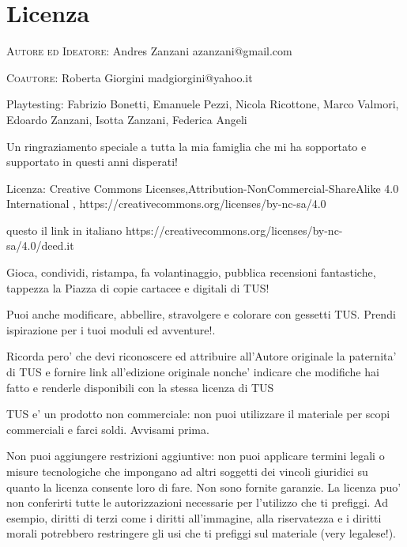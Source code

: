 \documentclass[a4paper,11pt,twoside,openany]{book}
\begin{document}
{\section{Licenza}

\bigskip

\textsc{Autore ed Ideatore}: Andres Zanzani azanzani@gmail.com

\bigskip
\textsc{Coautore}: Roberta Giorgini madgiorgini@yahoo.it

\bigskip

Playtesting: Fabrizio Bonetti, Emanuele Pezzi, Nicola Ricottone, Marco Valmori, Edoardo Zanzani, Isotta Zanzani, Federica Angeli

\bigskip

Un ringraziamento speciale a tutta la mia famiglia che mi ha sopportato e supportato in questi anni disperati!

\bigskip

Licenza: Creative Commons Licenses,Attribution-NonCommercial-ShareAlike 4.0 International , https://creativecommons.org/licenses/by-nc-sa/4.0

questo il link in italiano https://creativecommons.org/licenses/by-nc-sa/4.0/deed.it

Gioca, condividi, ristampa, fa volantinaggio, pubblica recensioni fantastiche, tappezza la Piazza di copie cartacee e digitali di TUS!

Puoi anche modificare, abbellire, stravolgere e colorare con gessetti TUS. Prendi ispirazione per i tuoi moduli ed avventure!.

Ricorda pero' che devi riconoscere ed attribuire all'Autore originale la paternita' di TUS e fornire link all'edizione originale nonche' indicare che modifiche hai fatto e renderle disponibili con la stessa licenza di TUS

\bigskip
TUS e' un prodotto non commerciale: non puoi utilizzare il materiale per scopi commerciali e farci soldi. Avvisami prima.

\bigskip
Non puoi aggiungere restrizioni aggiuntive: non puoi applicare termini legali o misure tecnologiche che impongano ad altri soggetti dei vincoli giuridici su quanto la licenza consente loro di fare. Non sono fornite garanzie. La licenza puo' non conferirti tutte le autorizzazioni necessarie per l'utilizzo che ti prefiggi. Ad esempio, diritti di terzi come i diritti all'immagine, alla riservatezza e i diritti morali potrebbero restringere gli usi che ti prefiggi sul materiale (very legalese!).

}
\end{document}

